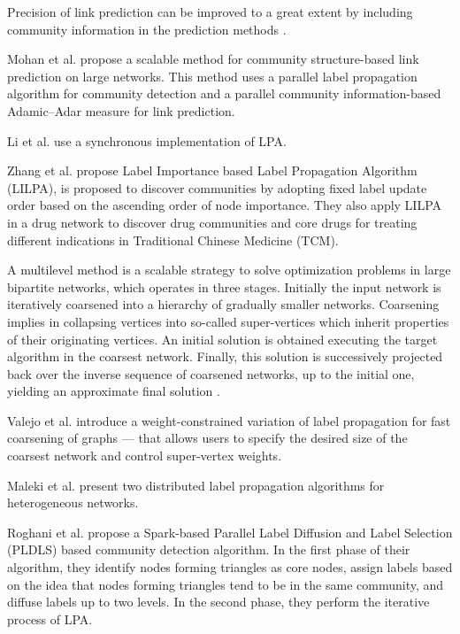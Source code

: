 {Precision of link prediction can be improved to a great extent by including community information in the prediction methods \cite{mohan2017scalable}.

Mohan et al. \cite{mohan2017scalable} propose a scalable method for community structure-based link prediction on large networks. This method uses a parallel label propagation algorithm for community detection and a parallel community information-based Adamic–Adar measure for link prediction.

Li et al. \cite{li2015detecting} use a synchronous implementation of LPA.

Zhang et al. \cite{zhang2020lilpa} propose Label Importance based Label Propagation Algorithm (LILPA), is proposed to discover communities by adopting fixed label update order based on the ascending order of node importance. They also apply LILPA in a drug network to discover drug communities and core drugs for treating different indications in Traditional Chinese Medicine (TCM).

A multilevel method is a scalable strategy to solve optimization problems in large bipartite networks, which operates in three stages. Initially the input network is iteratively coarsened into a hierarchy of gradually smaller networks. Coarsening implies in collapsing vertices into so-called super-vertices which inherit properties of their originating vertices. An initial solution is obtained executing the target algorithm in the coarsest network. Finally, this solution is successively projected back over the inverse sequence of coarsened networks, up to the initial one, yielding an approximate final solution \cite{valejo2020coarsening}.

Valejo et al. \cite{valejo2020coarsening} introduce a weight-constrained variation of label propagation for fast coarsening of graphs --- that allows users to specify the desired size of the coarsest network and control super-vertex weights.

Maleki et al. \cite{maleki2020dhlp} present two distributed label propagation algorithms for heterogeneous networks.

Roghani et al. \cite{roghani2021pldls} propose a Spark-based Parallel Label Diffusion and Label Selection (PLDLS) based community detection algorithm. In the first phase of their algorithm, they identify nodes forming triangles as core nodes, assign labels based on the idea that nodes forming triangles tend to be in the same community, and diffuse labels up to two levels. In the second phase, they perform the iterative process of LPA.

}
